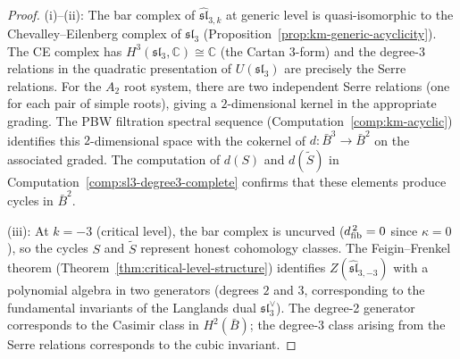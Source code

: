 \begin{proof}
(i)--(ii): The bar complex of $\widehat{\mathfrak{sl}}_{3,k}$ at
generic level is quasi-isomorphic to the Chevalley--Eilenberg complex of
$\mathfrak{sl}_3$ (Proposition~\ref{prop:km-generic-acyclicity}).  The
CE complex has $H^3(\mathfrak{sl}_3, \mathbb{C}) \cong \mathbb{C}$
(the Cartan $3$-form) and the degree-3 relations in the quadratic
presentation of $U(\mathfrak{sl}_3)$ are precisely the Serre relations.
For the $A_2$ root system, there are two independent Serre relations
(one for each pair of simple roots), giving a $2$-dimensional kernel
in the appropriate grading.  The PBW filtration spectral sequence
(Computation~\ref{comp:km-acyclic}) identifies this $2$-dimensional
space with the cokernel of $d\colon \bar{B}^3 \to \bar{B}^2$ on the
associated graded.  The computation of $d(S)$ and $d(\tilde{S})$ in
Computation~\ref{comp:sl3-degree3-complete} confirms that these
elements produce cycles in $\bar{B}^2$.

(iii): At $k = -3$ (critical level), the bar complex is uncurved ($d_{\mathrm{fib}}^{\,2} = 0$ since $\kappa = 0$),
so the cycles $S$ and $\tilde{S}$ represent honest cohomology classes.
The Feigin--Frenkel theorem (Theorem~\ref{thm:critical-level-structure})
identifies $Z(\widehat{\mathfrak{sl}}_{3,-3})$ with a polynomial algebra
in two generators (degrees $2$ and $3$, corresponding to the fundamental
invariants of the Langlands dual $\mathfrak{sl}_3^\vee$).  The degree-2
generator corresponds to the Casimir class in $H^2(\bar{B})$; the
degree-3 class arising from the Serre relations corresponds to the
cubic invariant.
\end{proof}

